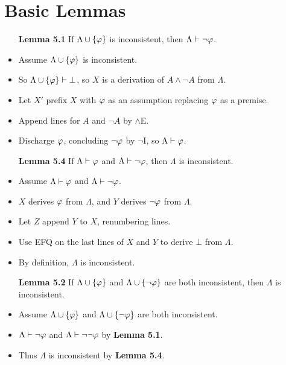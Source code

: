 \documentclass[a4paper, 11pt]{article} %
\begin{document}
\section*{Basic Lemmas}

\begin{itemize}
  \item[\bf Lemma 5.1] If $\Lambda\cup\lbrace\varphi\rbrace$ is inconsistent, then $\Lambda\vdash\neg\varphi$.
    \item Assume $\Lambda\cup\lbrace\varphi\rbrace$ is inconsistent.
    \item So $\Lambda\cup\lbrace\varphi\rbrace \vdash \bot$, so $X$ is a derivation of $A \wedge \neg A$ from $\Lambda$.
    \item Let $X'$ prefix $X$ with $\varphi$ as an assumption replacing $\varphi$ as a premise.
    \item Append lines for $A$ and $\neg A$ by $\wedge$E. 
    \item Discharge $\varphi$, concluding $\neg \varphi$ by $\neg$I, so $\Lambda \vdash \varphi$. 
  \item[\bf Lemma 5.4] If $\Lambda\vdash\varphi$ and $\Lambda\vdash\neg\varphi$, then $\Lambda$ is inconsistent.
    \item Assume $\Lambda\vdash\varphi$ and $\Lambda\vdash\neg\varphi$.
    \item $X$ derives $\varphi$ from $\Lambda$, and $Y$ derives $\neg\varphi$ from $\Lambda$. 
    \item Let $Z$ append $Y$ to $X$, renumbering lines.
    \item Use EFQ on the last lines of $X$ and $Y$ to derive $\bot$ from $\Lambda$. 
    \item By definition, $\Lambda$ is inconsistent.
  \item[\bf Lemma 5.2] If $\Lambda \cup \lbrace\varphi\rbrace$ and $\Lambda\cup \lbrace\neg\varphi\rbrace$ are both inconsistent, then $\Lambda$ is inconsistent.
    \item Assume $\Lambda \cup \lbrace\varphi\rbrace$ and $\Lambda\cup \lbrace\neg\varphi\rbrace$ are both inconsistent.
    \item $\Lambda\vdash \neg\varphi$ and $\Lambda\vdash\neg\neg\varphi$ by \textbf{Lemma 5.1}.
    \item Thus $\Lambda$ is inconsistent by \textbf{Lemma 5.4}. 
\end{itemize}
\end{document}

